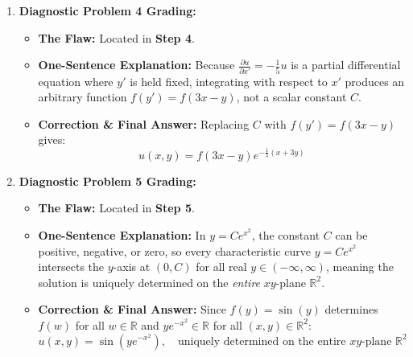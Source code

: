 \documentclass[11pt]{article}
\begin{document}
\begin{enumerate}
    \item \textbf{Diagnostic Problem 4 Grading:}
    \begin{itemize}
        \item \textbf{The Flaw:} Located in \textbf{Step 4}.
        \item \textbf{One-Sentence Explanation:} Because $\frac{\partial u}{\partial x'} = -\frac{1}{5}u$ is a partial differential equation where $y'$ is held fixed, integrating with respect to $x'$ produces an arbitrary function $f(y') = f(3x - y)$, not a scalar constant $C$.
        \item \textbf{Correction \& Final Answer:} Replacing $C$ with $f(y') = f(3x - y)$ gives:
        \[
        \boxed{u(x, y) = f(3x - y)e^{-\frac{1}{5}(x + 3y)}}
        \]
    \end{itemize}

    \item \textbf{Diagnostic Problem 5 Grading:}
    \begin{itemize}
        \item \textbf{The Flaw:} Located in \textbf{Step 5}.
        \item \textbf{One-Sentence Explanation:} In $y = Ce^{x^2}$, the constant $C$ can be positive, negative, or zero, so every characteristic curve $y = Ce^{x^2}$ intersects the $y$-axis at $(0, C)$ for all real $y \in (-\infty, \infty)$, meaning the solution is uniquely determined on the \emph{entire} $xy$-plane $\mathbb{R}^2$.
        \item \textbf{Correction \& Final Answer:} Since $f(y) = \sin(y)$ determines $f(w)$ for all $w \in \mathbb{R}$ and $ye^{-x^2} \in \mathbb{R}$ for all $(x, y) \in \mathbb{R}^2$:
        \[
        \boxed{u(x, y) = \sin\left(ye^{-x^2}\right), \quad \text{uniquely determined on the entire } xy\text{-plane } \mathbb{R}^2}
        \]
    \end{itemize}
\end{enumerate}
\end{document}
